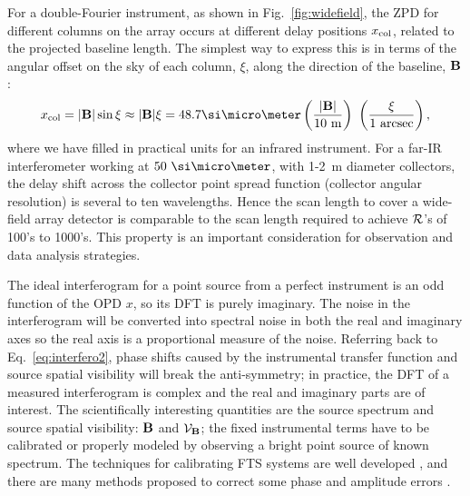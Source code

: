 For a double-Fourier instrument, as shown in Fig.~\ref{fig:widefield}, the ZPD for different columns on the array occurs at different delay positions $x_{\textrm{col}}$, related to
the projected baseline length. The simplest way to express this is in terms of the angular offset on the sky of each column, $\xi$, along the
direction of the baseline, $\mathbf{B}$:
\begin{equation}
x_{\col} = | \baseline | \sin\xi \approx | \baseline | \xi = 48.7 \um \left({| \baseline | \over 10~\textrm{m}}\right) \ \left( {\xi \over 1~\textrm{arcsec}}\right) ,
\label{eq:delay}
\end{equation}
where we have filled in
practical units for an infrared instrument. For a far-IR interferometer working at $50~\um$, with
1-2~m diameter collectors, the delay shift across the collector point spread function (collector angular resolution) is several to ten wavelengths.
Hence the scan length to cover a wide-field array detector is comparable to the scan length required to achieve
$\mathcal{R}$'s of 100's to 1000's. This property is an important consideration for observation and data analysis strategies.

The ideal interferogram for a point source from a perfect instrument is an odd function of the OPD $x$, so its DFT is purely imaginary. The noise in the interferogram will be converted into spectral noise in both the real and imaginary axes so the real axis is a proportional measure of the noise. 
Referring back to Eq.~\ref{eq:interfero2}, phase shifts caused by the instrumental transfer function and source spatial visibility will
break the anti-symmetry; in practice, the DFT of a measured interferogram is complex and the real and imaginary parts are of interest.
The scientifically interesting quantities are the source spectrum and source spatial visibility: $\textrm{\textbf{B}}$ and $\mathcal{V}_{\mathbf{B}}$; the fixed
instrumental terms have to be calibrated or properly modeled
by observing a bright point source of known spectrum. The techniques for calibrating FTS systems are well developed
\citep[e.g.][]{Davis:2001tr}, and there are many methods proposed to correct some phase and amplitude errors \citep[e.g.][]{Forman:1966wx, Sromovsky:2003in}. 


